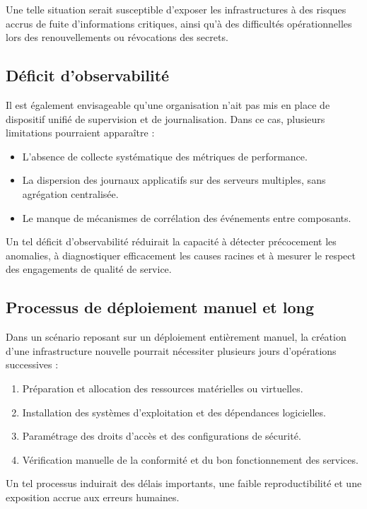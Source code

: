 Une telle situation serait susceptible d'exposer les infrastructures à des risques accrus de fuite d'informations critiques, ainsi qu'à des difficultés opérationnelles lors des renouvellements ou révocations des secrets.

\subsection{Déficit d'observabilité}

Il est également envisageable qu'une organisation n'ait pas mis en place de dispositif unifié de supervision et de journalisation. Dans ce cas, plusieurs limitations pourraient apparaître :
\begin{itemize}
	\item L'absence de collecte systématique des métriques de performance.
	\item La dispersion des journaux applicatifs sur des serveurs multiples, sans agrégation centralisée.
	\item Le manque de mécanismes de corrélation des événements entre composants.
\end{itemize}

Un tel déficit d'observabilité réduirait la capacité à détecter précocement les anomalies, à diagnostiquer efficacement les causes racines et à mesurer le respect des engagements de qualité de service.

\subsection{Processus de déploiement manuel et long}

Dans un scénario reposant sur un déploiement entièrement manuel, la création d'une infrastructure nouvelle pourrait nécessiter plusieurs jours d'opérations successives :
\begin{enumerate}
	\item Préparation et allocation des ressources matérielles ou virtuelles.
	\item Installation des systèmes d'exploitation et des dépendances logicielles.
	\item Paramétrage des droits d'accès et des configurations de sécurité.
	\item Vérification manuelle de la conformité et du bon fonctionnement des services.
\end{enumerate}

Un tel processus induirait des délais importants, une faible reproductibilité et une exposition accrue aux erreurs humaines.

